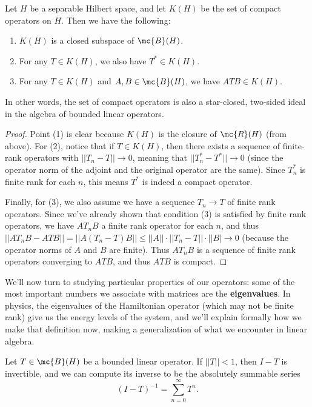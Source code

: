 \begin{theorem}
Let $H$ be a separable Hilbert space, and let $K(H)$ be the set of compact operators on $H$. Then we have the following:
\begin{enumerate}
\item $K(H)$ is a closed subspace of $\mc{B}(H)$.
\item For any $T \in K(H)$, we also have $T^\ast \in K(H)$.
\item For any $T \in K(H)$ and $A, B \in \mc{B}(H)$, we have $ATB \in K(H)$.
\end{enumerate}
\end{theorem}

In other words, the set of compact operators is also a star-closed, two-sided ideal in the algebra of bounded linear operators.
 
\begin{proof}
Point (1) is clear because $K(H)$ is the closure of $\mc{R}(H)$ (from above). For (2), notice that if $T \in K(H)$, then there exists a sequence of finite-rank operators with $||T_n - T|| \to 0$, meaning that $||T_n^\ast - T^\ast|| \to 0$ (since the operator norm of the adjoint and the original operator are the same). Since $T_n^\ast$ is finite rank for each $n$, this means $T^\ast$ is indeed a compact operator.

Finally, for (3), we also assume we have a sequence $T_n \to T$ of finite rank operators. Since we've already shown that condition (3) is satisfied by finite rank operators, we have $AT_nB$ a finite rank operator for each $n$, and thus $||AT_nB - ATB|| = ||A(T_n-T)B|| \le ||A|| \cdot ||T_n-T|| \cdot ||B| \to 0$ (because the operator norms of $A$ and $B$ are finite). Thus $AT_nB$ is a sequence of finite rank operators converging to $ATB$, and thus $ATB$ is compact.
\end{proof}

We'll now turn to studying particular properties of our operators: some of the most important numbers we associate with matrices are the \textbf{eigenvalues}. In physics, the eigenvalues of the Hamiltonian operator (which may not be finite rank) give us the energy levels of the system, and we'll explain formally how we make that definition now, making a generalization of what we encounter in linear algebra. 

\begin{proposition}\label{linopinvbound}
Let $T \in \mc{B}(H)$ be a bounded linear operator. If $||T|| < 1$, then $I - T$ is invertible, and we can compute its inverse to be the absolutely summable series 
\[
    (I-T)^{-1} = \sum_{n=0}^{\infty} T^n.
\]
\end{proposition}

